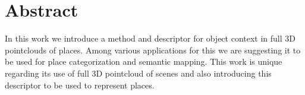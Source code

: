 \cleardoublepage
{}
{}
\chapter*{Abstract}

In this work we introduce a method and descriptor for object context in full 3D pointclouds of places.
Among various applications for this we are suggesting it to be used for place categorization and semantic mapping.
This work is unique regarding its use of full 3D pointcloud of scenes and also introducing this descriptor to be used to 
represent places.
